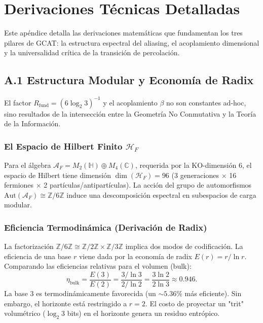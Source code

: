 \documentclass[12pt, a4paper]{article}
\theoremstyle{plain}
\theoremstyle{definition}
\begin{document}
\section{Derivaciones Técnicas Detalladas}
\label{app:derivaciones}

Este apéndice detalla las derivaciones matemáticas que fundamentan los tres pilares de GCAT: la estructura espectral del aliasing, el acoplamiento dimensional y la universalidad crítica de la transición de percolación.

\subsection{A.1 Estructura Modular y Economía de Radix}
\label{app:spectral_trace}

El factor $R_{\text{fund}} = (6\log_2 3)^{-1}$ y el acoplamiento $\beta$ no son constantes ad-hoc, sino resultados de la intersección entre la Geometría No Conmutativa y la Teoría de la Información.

\subsubsection{El Espacio de Hilbert Finito \texorpdfstring{$\mathcal{H}_F$}{H\_F}}
Para el álgebra $\mathcal{A}_F = M_2(\mathbb{H}) \oplus M_4(\mathbb{C})$, requerida por la KO-dimensión 6, el espacio de Hilbert tiene dimensión $\dim(\mathcal{H}_F) = 96$ (3 generaciones $\times$ 16 fermiones $\times$ 2 partículas/antipartículas). La acción del grupo de automorfismos $\text{Aut}(\mathcal{A}_F) \cong \mathbb{Z}/6\mathbb{Z}$ induce una descomposición espectral en subespacios de carga modular.

\subsubsection{Eficiencia Termodinámica (Derivación de Radix)}
La factorización $\mathbb{Z}/6\mathbb{Z} \cong \mathbb{Z}/2\mathbb{Z} \times \mathbb{Z}/3\mathbb{Z}$ implica dos modos de codificación. La eficiencia de una base $r$ viene dada por la economía de radix $E(r) = r/\ln r$.
Comparando las eficiencias relativas para el volumen (bulk):
\begin{equation}
\eta_{\text{bulk}} = \frac{E(3)}{E(2)} = \frac{3/\ln 3}{2/\ln 2} = \frac{3 \ln 2}{2 \ln 3} \approx 0.946.
\end{equation}
La base 3 es termodinámicamente favorecida (un $\sim 5.36\%$ más eficiente). Sin embargo, el horizonte está restringido a $r=2$. El costo de proyectar un "trit" volumétrico ($\log_2 3$ bits) en el horizonte genera un residuo entrópico.
\end{document}
